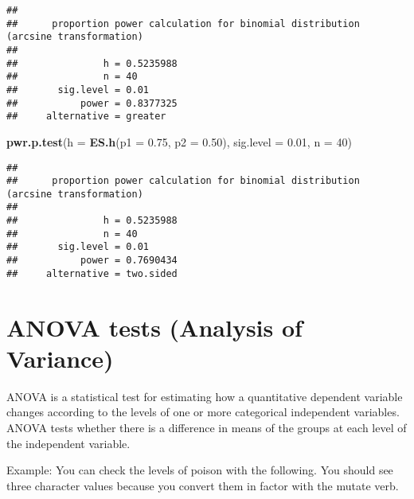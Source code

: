\documentclass[]{article}
\newenvironment{Shaded}{\begin{snugshade}}{\end{snugshade}}
\newcommand{\DataTypeTok}[1]{\textcolor[rgb]{0.13,0.29,0.53}{#1}}
\newcommand{\DecValTok}[1]{\textcolor[rgb]{0.00,0.00,0.81}{#1}}
\newcommand{\FloatTok}[1]{\textcolor[rgb]{0.00,0.00,0.81}{#1}}
\newcommand{\KeywordTok}[1]{\textcolor[rgb]{0.13,0.29,0.53}{\textbf{#1}}}
\newcommand{\NormalTok}[1]{#1}
\newcommand{\OperatorTok}[1]{\textcolor[rgb]{0.81,0.36,0.00}{\textbf{#1}}}
\newcommand{\OtherTok}[1]{\textcolor[rgb]{0.56,0.35,0.01}{#1}}
\newcommand{\StringTok}[1]{\textcolor[rgb]{0.31,0.60,0.02}{#1}}
\begin{document}
\begin{verbatim}
## 
##      proportion power calculation for binomial distribution (arcsine transformation) 
## 
##               h = 0.5235988
##               n = 40
##       sig.level = 0.01
##           power = 0.8377325
##     alternative = greater
\end{verbatim}

\begin{Shaded}
\begin{Highlighting}[]
\KeywordTok{pwr.p.test}\NormalTok{(}\DataTypeTok{h =} \KeywordTok{ES.h}\NormalTok{(}\DataTypeTok{p1 =} \FloatTok{0.75}\NormalTok{, }\DataTypeTok{p2 =} \FloatTok{0.50}\NormalTok{),}
           \DataTypeTok{sig.level =} \FloatTok{0.01}\NormalTok{,}
           \DataTypeTok{n =} \DecValTok{40}\NormalTok{)}
\end{Highlighting}
\end{Shaded}

\begin{verbatim}
## 
##      proportion power calculation for binomial distribution (arcsine transformation) 
## 
##               h = 0.5235988
##               n = 40
##       sig.level = 0.01
##           power = 0.7690434
##     alternative = two.sided
\end{verbatim}

\hypertarget{anova-tests-analysis-of-variance}{%
\section{ANOVA tests (Analysis of
Variance)}\label{anova-tests-analysis-of-variance}}

ANOVA is a statistical test for estimating how a quantitative dependent
variable changes according to the levels of one or more categorical
independent variables. ANOVA tests whether there is a difference in
means of the groups at each level of the independent variable.

Example: You can check the levels of poison with the following. You
should see three character values because you convert them in factor
with the mutate verb.

\begin{Shaded}
\end{Shaded}
\end{document}
